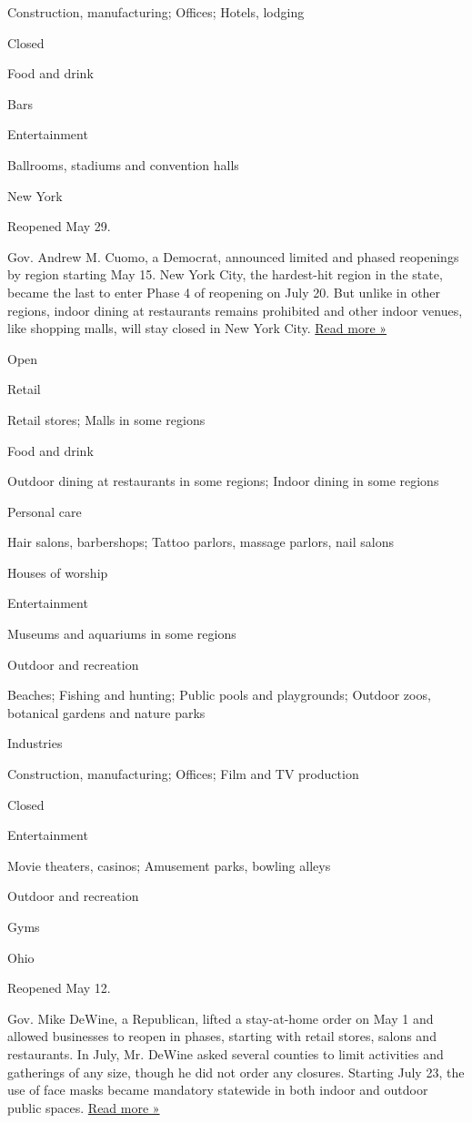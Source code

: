 Construction, manufacturing; Offices; Hotels, lodging

Closed

Food and drink

Bars

Entertainment

Ballrooms, stadiums and convention halls

New York

Reopened May 29.

Gov. Andrew M. Cuomo, a Democrat, announced limited and phased
reopenings by region starting May 15. New York City, the hardest-hit
region in the state, became the last to enter Phase 4 of reopening on
July 20. But unlike in other regions, indoor dining at restaurants
remains prohibited and other indoor venues, like shopping malls, will
stay closed in New York City.
\href{https://www.nytimes3xbfgragh.onion/2020/07/20/nyregion/nyc-phase-4-reopening-bars.html}{Read
more »}

Open

Retail

Retail stores; Malls in some regions

Food and drink

Outdoor dining at restaurants in some regions; Indoor dining in some
regions

Personal care

Hair salons, barbershops; Tattoo parlors, massage parlors, nail salons

Houses of worship

Entertainment

Museums and aquariums in some regions

Outdoor and recreation

Beaches; Fishing and hunting; Public pools and playgrounds; Outdoor
zoos, botanical gardens and nature parks

Industries

Construction, manufacturing; Offices; Film and TV production

Closed

Entertainment

Movie theaters, casinos; Amusement parks, bowling alleys

Outdoor and recreation

Gyms

Ohio

Reopened May 12.

Gov. Mike DeWine, a Republican, lifted a stay-at-home order on May 1 and
allowed businesses to reopen in phases, starting with retail stores,
salons and restaurants. In July, Mr. DeWine asked several counties to
limit activities and gatherings of any size, though he did not order any
closures. Starting July 23, the use of face masks became mandatory
statewide in both indoor and outdoor public spaces.
\href{https://www.news5cleveland.com/news/state/ohio-gov-mike-dewine-announces-statewide-mask-mandate-effective-thursday}{Read
more »}

